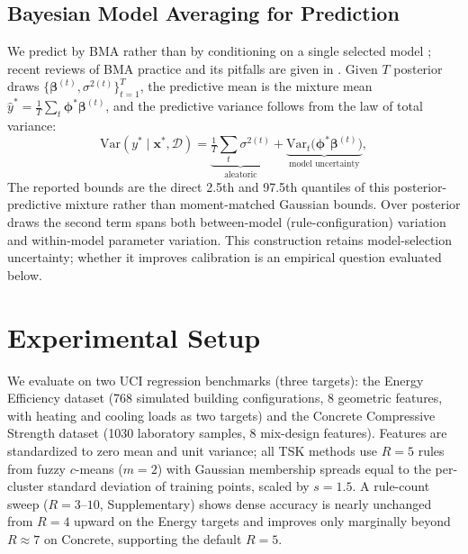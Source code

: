\documentclass[1p,times]{elsarticle}
\begin{document}
\subsection{Bayesian Model Averaging for Prediction}
\label{sec:bma}

We predict by BMA rather than by conditioning on a single selected model \cite{hoeting1999bayesian}; recent reviews of BMA practice and its pitfalls are given in \cite{fragoso2018bayesian}. Given $T$ posterior draws $\{\boldsymbol{\beta}^{(t)},\sigma^{2(t)}\}_{t=1}^{T}$, the predictive mean is the mixture mean $\hat{y}^*=\frac1T\sum_t \boldsymbol{\phi}^*\boldsymbol{\beta}^{(t)}$, and the predictive variance follows from the law of total variance:
\begin{equation}
 \mathrm{Var}(y^*\mid\mathbf{x}^*,\mathcal{D})
 = \underbrace{\tfrac1T\sum_t \sigma^{2(t)}}_{\text{aleatoric}}
 + \underbrace{\mathrm{Var}_t\big(\boldsymbol{\phi}^*\boldsymbol{\beta}^{(t)}\big)}_{\text{model uncertainty}},
 \label{eq:bma}
\end{equation}
The reported bounds are the direct 2.5th and 97.5th quantiles of this posterior-predictive mixture rather than moment-matched Gaussian bounds.
Over posterior draws the second term spans both between-model (rule-configuration) variation and within-model parameter variation.
This construction retains model-selection uncertainty; whether it improves calibration is an empirical question evaluated below.

\section{Experimental Setup}
\label{sec:setup}

We evaluate on two UCI regression benchmarks (three targets): the Energy Efficiency dataset \cite{tsanas2012accurate} (768 simulated building configurations, 8 geometric features, with heating and cooling loads as two targets) and the Concrete Compressive Strength dataset \cite{yeh1998modeling} (1030 laboratory samples, 8 mix-design features). Features are standardized to zero mean and unit variance; all TSK methods use $R=5$ rules from fuzzy $c$-means ($m=2$) with Gaussian membership spreads equal to the per-cluster standard deviation of training points, scaled by $s=1.5$.
A rule-count sweep ($R=3$--$10$, Supplementary) shows dense accuracy is nearly unchanged from $R=4$ upward on the Energy targets and improves only marginally beyond $R\approx7$ on Concrete, supporting the default $R=5$.
\end{document}
